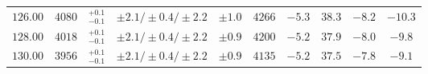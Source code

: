 \begin{table}[ht]
\begin{center}
\begin{small}
\begin{tabular}{cccccccc|cc}
$126.00$ & $4080$ & $^{+0.1}_{-0.1}$ & $\pm 2.1/\pm 0.4/\pm 2.2$ & $\pm 1.0$ & $4266$ & $-5.3$ & $38.3$ & $-8.2$ & $-10.3$ \\
$128.00$ & $4018$ & $^{+0.1}_{-0.1}$ & $\pm 2.1/\pm 0.4/\pm 2.2$ & $\pm 0.9$ & $4200$ & $-5.2$ & $37.9$ & $-8.0$ & $-9.8 $ \\
$130.00$ & $3956$ & $^{+0.1}_{-0.1}$ & $\pm 2.1/\pm 0.4/\pm 2.2$ & $\pm 0.9$ & $4135$ & $-5.2$ & $37.5$ & $-7.8$ & $-9.1 $ \\
\bottomrule
\end{tabular}%
\end{small}%
\end{center}%
\end{table}











































